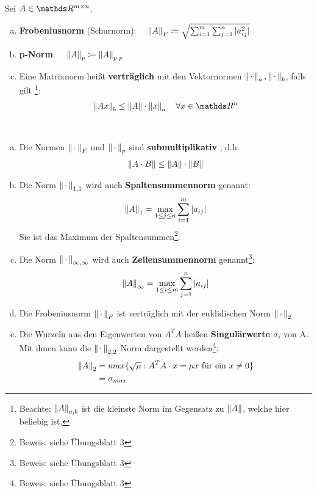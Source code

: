 \begin{Defe}
  \label{3.2.5}
  Sei $A\in \R^{m\times n}$.
  \begin{enumerate}[a)]
  \item \textbf{Frobeniusnorm} (Schurnorm):
    $ \quad \nn{A}_F \coloneqq \sqrt{\sum_{i=1}^{m}\sum_{j=1}^{n}|a_{ij}^2|}
    \index{Norm!Frobeniusnorm}$
  \item \textbf{p-Norm}: 
    $\quad \nn{A}_p \coloneqq \nn{A}_{p,p}
    \index{p-Norm}$
  \item Eine Matrixnorm heißt \textbf{verträglich}  mit den Vektornormen 
    $\left\| \,\cdot\, \right\|_a, \left\| \,\cdot\, \right\|_b$, falls gilt
    \footnote{ Beachte: $\left\| A \right\|_{a,b}$ ist die kleinste Norm im Gegensatz zu $\left\| A \right\|$, welche hier beliebig ist.}:
    \begin{gather*}
      \nn{Ax}_b \leq \nn{A}\cdot \nn{x}_a \quad \forall x\in \R^n
    \end{gather*}
  \end{enumerate}
\end{Defe}

\begin{Beme}~
  \label{3.2.6}
  \begin{enumerate}[a)]
  \item Die Normen $\left\| \,\cdot\, \right\|_F$ und $\left\| \,\cdot\, \right\|_p$ sind \textbf{submultiplikativ} , d.h.
    \begin{gather*}
      \left\| A\cdot B \right\| \leq \left\| A \right\|\cdot\left\| B \right\|
    \end{gather*}
  \item Die Norm $\left\| \,\cdot\, \right\|_{1,1}$ wird auch \textbf{Spaltensummennorm} genannt:
    \begin{gather*}
      \left\| A \right\|_1 = \max_{1\leq j \leq n}\sum_{i=1}^{m}|a_{ij}|
    \end{gather*}
    Sie ist das Maximum der Spaltensummen\footnote{Beweis: siehe Übungsblatt 3}.
  \item Die Norm $\left\| \,\cdot\, \right\|_{\infty, \infty}$ wird auch \textbf{Zeilensummennorm} 
    genannt\footnote{Beweis: siehe Übungsblatt 3}:
    \begin{gather*}
      \left\| A \right\|_\infty = \max_{1\leq i \leq m}\sum_{j=1}^{n}|a_{ij}|
    \end{gather*}
  \item Die Frobeniusnorm $\left\| \,\cdot\, \right\|_F$ ist verträglich mit der euklidischen Norm $\left\| \,\cdot\, \right\|_2$
  \item Die Wurzeln aus den Eigenwerten von $A^TA$ heißen \textbf{Singulärwerte $\sigma_i$}  von A.
    Mit ihnen kann die $\left\| \,\cdot\, \right\|_{2,2}$ Norm dargestellt werden\footnote{Beweis: siehe Übungsblatt 3}:
    \begin{align*}
      \left\| A \right\|_2 &= max \{\sqrt{\mu} : A^TA\cdot x = \mu x\text{ für ein }x\neq 0 \} \\
               & = \sigma_{max}
    \end{align*}
  \end{enumerate}
\end{Beme}



